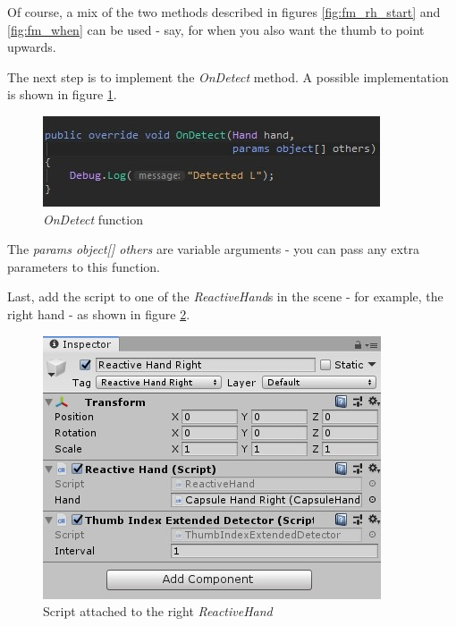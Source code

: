 \documentclass[12pt,a4paper,twoside]{report}
\begin{document}
Of course, a mix of the two methods described in figures \ref{fig:fm_rh_start} and \ref{fig:fm_when} can be used - say, for when you also want the thumb to point upwards.


The next step is to implement the \textit{OnDetect} method. A possible implementation is shown in figure \ref{fig:fm_onDetect}.

\begin{figure}[h]
  \centering
  \includegraphics[width=0.9\linewidth]{img/FluentMotion_onDetect.jpg}
  \caption{\textit{OnDetect} function}
  \label{fig:fm_onDetect}
\end{figure}

The \textit{params object[] others} are variable arguments - you can pass any extra parameters to this function.

Last, add the script to one of the \textit{ReactiveHand}s in the scene - for example, the right hand - as shown in figure \ref{fig:fm_script_righthand}. 

\begin{figure}[h]
  \centering
  \includegraphics[width=0.9\linewidth]{img/FluentMotion_script_attached.jpg}
  \caption{Script attached to the right \textit{ReactiveHand}}
  \label{fig:fm_script_righthand}
\end{figure}
\end{document}
